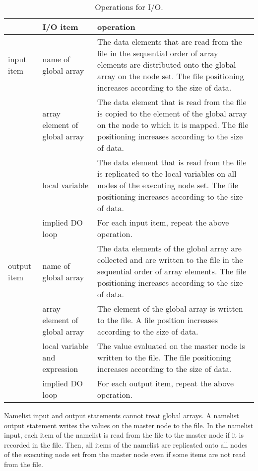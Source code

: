    \begin{table}[h]
    \begin{center}
    \caption{Operations for I/O.}
    \label{tb:opforio}
     \begin{tabular}{|l|p{40mm}|p{80mm}|}
      \hline
      \multicolumn{1}{|c}{ }  & {\bf I/O item} & {\bf operation} \\
      \hline
      input item & name of global array & The data elements that are read 
	      from the file in the sequential order of array elements are distributed onto 
	      the global array on the node set. The file positioning
			   increases according to the size of data. \\
      \cline{2-3}
      & array element of global array & The data element that is read from the file
	      is copied to the element of the global array on the node to which it is mapped.
	      The file positioning increases according to the size of data. \\
      \cline{2-3}
      & local variable & The data element that is read from the file is replicated to the
	      local variables on all nodes of the executing node
	      set. The file positioning increases according to the size of data. \\
      \cline{2-3}
      & implied DO loop & For each input item, repeat the above operation. \\
      \hline
      output item & name of global array & The data elements of the
	      global array are collected and are written to the
	      file in the sequential order of array elements. The file
	      positioning increases according to the size of data. \\
      \cline{2-3}
      & array element of global array & The element of the global array
			   is written to the file. A file position increases
			   according to the size of data. \\
      \cline{2-3}
      & local variable and expression & The value evaluated on the master node
	      is written to the file. The file positioning increases
			   according to the size of data. \\
      \cline{2-3}
      & implied DO loop & For each output item, repeat the above operation. \\
      \hline
      \end{tabular}
     \end{center}
    \label{tb:aaa}
   \end{table}

   Namelist input and output statements cannot treat global arrays.
   A namelist output statement writes the values on the master node to
   the file.
   In the namelist input, each item of the namelist is read from the
   file to the master node if it is recorded in the file.
   Then, all items of the namelist are replicated onto all nodes of
   the executing node set from the master node even if some items are not read from the file.

